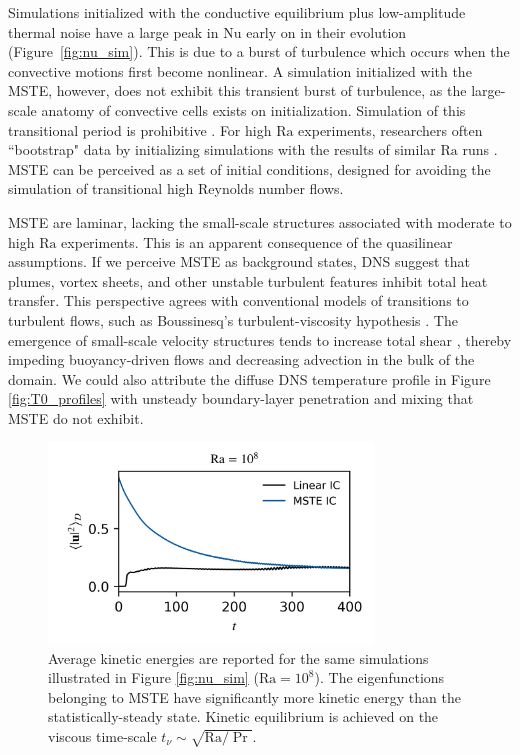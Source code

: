 \documentclass[reprint,amsmath,amssymb,aps]{revtex4-1}
\newcommand\Ra{\mathrm{Ra}}
\newcommand\Nu{\mathrm{Nu}}
\begin{document}
Simulations initialized with the conductive equilibrium plus low-amplitude thermal noise have a large peak in $\Nu$ early on in their evolution (Figure~\ref{fig:nu_sim}).
This is due to a burst of turbulence which occurs when the convective motions first become nonlinear.
A simulation initialized with the MSTE, however, does not exhibit this transient burst of turbulence, as the large-scale anatomy of convective cells exists on initialization. 
Simulation of this transitional period is prohibitive \cite{Anders_AE}. 
For high $\Ra$ experiments, researchers often ``bootstrap" data by initializing simulations with the results of similar $\Ra$ runs \cite{Verzicco, Johnston}. 
MSTE can be perceived as a set of initial conditions, designed for avoiding the simulation of transitional high Reynolds number flows.

MSTE are laminar, lacking the small-scale structures associated with moderate to high $\Ra$ experiments. 
This is an apparent consequence of the quasilinear assumptions. 
If we perceive MSTE as background states, DNS suggest that plumes, vortex sheets, and other unstable turbulent features inhibit total heat transfer. 
This perspective agrees with conventional models of transitions to turbulent flows, such as Boussinesq's turbulent-viscosity hypothesis \cite{boussinesq_1877}. The emergence of small-scale velocity structures tends to increase total shear \cite{Lecoanet_KH, drazin_reid_2004, pope_2000}, thereby impeding buoyancy-driven flows and decreasing advection in the bulk of the domain. 
We could also attribute the diffuse DNS temperature profile in Figure \ref{fig:T0_profiles} with unsteady boundary-layer penetration and mixing that MSTE do not exhibit.

\begin{figure}
    \begin{minipage}{3.4in}
        \centering
        \includegraphics[width=3.4in]{sim_eq_ke.png}
        \caption{Average kinetic energies are reported for the same simulations illustrated in Figure \ref{fig:nu_sim} ($\Ra = 10^8$). 
        The eigenfunctions belonging to MSTE have significantly more kinetic energy than the statistically-steady state. 
        Kinetic equilibrium is achieved on the viscous time-scale $t_{\nu} \sim \sqrt{\Ra / \Pr}$.}
        \label{fig:ke_sim}
    \end{minipage}
\end{figure}
\end{document}
